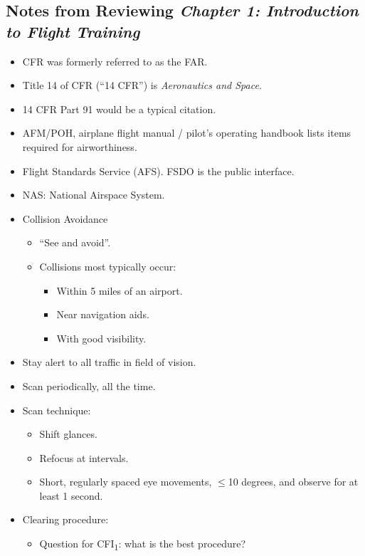 \documentclass[letterpaper,10pt,titlepage]{article}
\begin{document}
\subsection{Notes from Reviewing \emph{Chapter 1:  Introduction to Flight
            Training}}
\label{snra0:sift0}

\begin{itemize}
\item CFR was formerly referred to as the FAR.
\item Title 14 of CFR (``14 CFR'') is \emph{Aeronautics and Space}.
\item 14 CFR Part 91 would be a typical citation.
\item AFM/POH, airplane flight manual / pilot's operating handbook lists items
      required for airworthiness.
\item Flight Standards Service (AFS).  FSDO is the public interface.
\item NAS:  National Airspace System.
\item Collision Avoidance
      \begin{itemize}
	  \item ``See and avoid''.
	  \item Collisions most typically occur:
	        \begin{itemize}
			\item Within 5 miles of an airport.
			\item Near navigation aids.
			\item With good visibility.
			\end{itemize}
	  \end{itemize}
	  \item Stay alert to all traffic in field of vision.
	  \item Scan periodically, all the time.
	  \item Scan technique:
	        \begin{itemize}
			\item Shift glances.
			\item Refocus at intervals.
			\item Short, regularly spaced eye movements, $\leq$10 degrees, and observe
			      for at least 1 second.
			\end{itemize}
	  \item Clearing procedure:
	        \begin{itemize}
			\item Question for CFI\textsubscript{1}:  what is the best procedure?
			\end{itemize}

\end{itemize}
\end{document}
